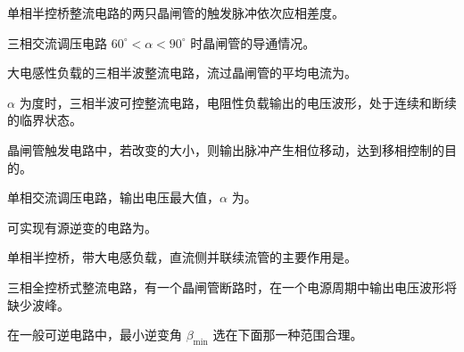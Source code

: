 \documentclass[电力电子]{subfiles}
\begin{document}
\begin{ti}
	单相半控桥整流电路的两只晶闸管的触发脉冲依次应相差度。
\end{ti}

\begin{ti}
	三相交流调压电路 $60^\circ < \alpha < 90^\circ$ 时晶闸管的导通情况。
\end{ti}

\begin{ti}
	大电感性负载的三相半波整流电路，流过晶闸管的平均电流为。
\end{ti}

\begin{ti}
	$\alpha$ 为度时，三相半波可控整流电路，电阻性负载输出的电压波形，处于连续和断续的临界状态。
\end{ti}

\begin{ti}
	晶闸管触发电路中，若改变的大小，则输出脉冲产生相位移动，达到移相控制的目的。
\end{ti}

\begin{ti}
	单相交流调压电路，输出电压最大值，$\alpha$ 为。
\end{ti}

\begin{ti}
	可实现有源逆变的电路为。
\end{ti}

\begin{ti}
	单相半控桥，带大电感负载，直流侧并联续流管的主要作用是。
\end{ti}

\begin{ti}
	三相全控桥式整流电路，有一个晶闸管断路时，在一个电源周期中输出电压波形将缺少波峰。
\end{ti}

\begin{ti}
	在一般可逆电路中，最小逆变角 $\beta_{\min}$ 选在下面那一种范围合理。
\end{ti}
\end{document}
